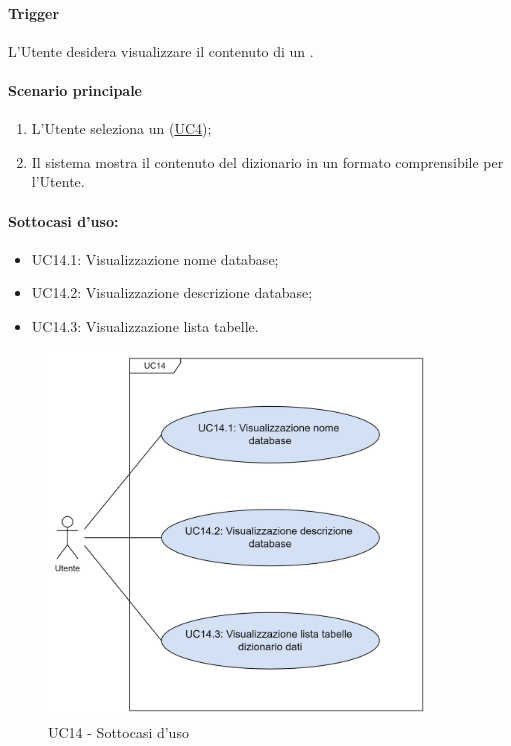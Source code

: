 \paragraph*{Trigger}
L'Utente desidera visualizzare il contenuto di un .

\paragraph*{Scenario principale}
\begin{enumerate}
  \item L'Utente seleziona un  (\hyperref[UC4]{UC4});
  \item Il sistema mostra il contenuto del dizionario in un formato comprensibile per l'Utente.
\end{enumerate}

\paragraph*{Sottocasi d'uso:}
\begin{itemize}
  \item UC14.1: Visualizzazione nome database;
  \item UC14.2: Visualizzazione descrizione database;
  \item UC14.3: Visualizzazione lista tabelle.
\end{itemize}

\begin{figure}[H]
  \centering
  \includegraphics[width=0.90\textwidth]{assets/uc14_1.png}
  \caption{UC14 - Sottocasi d'uso}
\end{figure}

